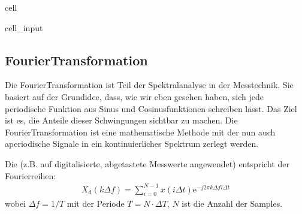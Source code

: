 \documentclass[letterpaper,10pt,english]{jupyterBook}
\begin{document}
\begin{sphinxuseclass}{cell}
\begin{sphinxVerbatimInput}
\begin{sphinxuseclass}{cell_input}
\begin{sphinxVerbatim}[commandchars=\\\{\}]
   
     
\end{sphinxVerbatim}

\end{sphinxuseclass}\end{sphinxVerbatimInput}

\end{sphinxuseclass}

\subsection{Fourier\sphinxhyphen{}Transformation}
\label{\detokenize{content/3_FourierAnalyse:fourier-transformation}}
\sphinxAtStartPar


\sphinxAtStartPar
Die Fourier\sphinxhyphen{}Transformation ist Teil der Spektralanalyse in der Messtechnik. Sie basiert auf der Grundidee, dass, wie wir eben gesehen haben, sich jede periodische Funktion aus Sinus\sphinxhyphen{} und Cosinusfunktionen schreiben lässt. Das Ziel ist es, die Anteile dieser Schwingungen sichtbar zu machen. Die Fourier\sphinxhyphen{}Transformation ist eine mathematische Methode mit der nun auch aperiodische Signale in ein kontinuierliches Spektrum zerlegt werden.

\sphinxAtStartPar
Die  (z.B. auf digitalisierte, abgetastete Messwerte angewendet) entspricht der Fourierreihen:
\begin{equation*}
\begin{split}X_\mathrm d (k \Delta f) = \sum_{i = 0}^{N-1} x(i\Delta t) \mathrm e^{-j 2\pi  k \Delta f i \Delta t}\end{split}
\end{equation*}
\sphinxAtStartPar
wobei \(\Delta f = 1/T\) mit der Periode \(T = N\cdot \Delta T\), \(N\) ist die Anzahl der Samples.
\end{document}
